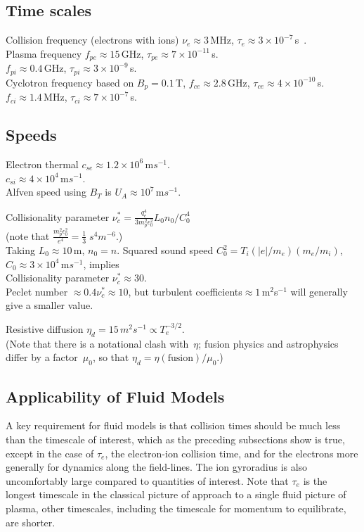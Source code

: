 \subsection{Time scales}

Collision frequency (electrons with ions) $\nu_e \approx 3$\,MHz, $\tau_e \approx 3 \times 10^{-7}$\,s~\cite{NRLpf07}. \\
Plasma frequency $f_{pe} \approx 15$\,GHz, $\tau_{pe} \approx 7 \times 10^{-11}$\,s. \\
$f_{pi} \approx 0.4$\,GHz, $\tau_{pi} \approx 3 \times 10^{-9}$\,s. \\
Cyclotron frequency based on $B_p=0.1$\,T, $f_{ce} \approx 2.8$\,GHz, $\tau_{ce} \approx 4 \times 10^{-10}$\,s. \\
$f_{ci} \approx 1.4$\,MHz, $\tau_{ci}\approx  7\times 10^{-7}$\,s.

\subsection{Speeds}
Electron thermal $c_{se} \approx 1.2 \times 10^6$\,m$s^{-1}$. \\
$c_{si} \approx 4 \times 10^4$\,m$s^{-1}$. \\
Alfven speed using $B_T$ is $U_A \approx 10^7$\,m$s^{-1}$.

Collisionality parameter $\nu^{*}_c = \frac{q_e^4}{3 m_p^2\epsilon_0^2} L_0 n_0 /C_0^4$ \\
(note that $\frac{m_p^2\epsilon_0^2}{e^4}=\frac{1}{3}\;s^4 m^{-6}$.)\\
Taking $L_0 \approx 10$\,m, $n_0=n$.  Squared sound speed $C_0^2= T_i (|e|/m_e) (m_e/m_i)$, $C_0 \approx 3 \times 10^4$\,m$s^{-1}$, implies  \\
Collisionality parameter $\nu^{*}_c \approx 30$. \\
Peclet number $\approx 0.4 \nu^{*}_c \approx 10$, but turbulent coefficients$\approx1$\,m$^2$s$^{-1}$
will generally give a smaller value.

Resistive diffusion $\eta_d=15$\,$m^2 s^{-1} \propto T_e^{-3/2}$. \\
(Note that there is a notational clash with~$\eta$; fusion physics and astrophysics
differ by a factor~$\mu_0$, so that $\eta_d=\eta(\mbox{fusion})/\mu_0$.)

\subsection{Applicability of Fluid Models}\label{sec:applmhd}
A key requirement for fluid models is that collision times should be much less than
the timescale of interest, which as the preceding subsections show is true, except in the case of
$\tau_e$, the electron-ion collision time, and for the electrons more generally
for dynamics along the field-lines. The ion gyroradius is also uncomfortably large
compared to quantities of interest. Note that $\tau_e$ is the longest timescale
in the classical picture of approach to a single fluid picture of plasma, other
timescales, including the timescale for momentum to equilibrate, are shorter.

